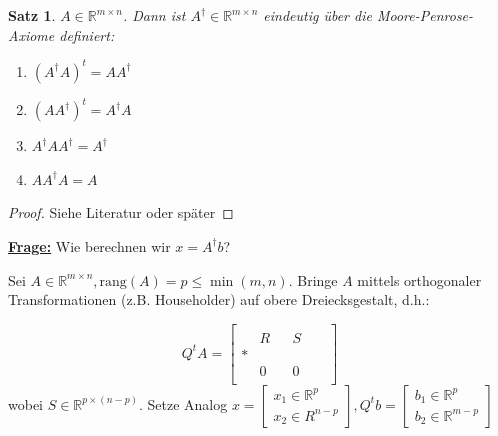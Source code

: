 \documentclass{book}
\newtheorem{theorem}[algorithm]{Satz}
\def\R{\mathbb{R}}
\def\rang{\text{rang}}
\begin{document}
        \begin{theorem}\label{s2.23}
            $A\in\R^{m\times n}$. Dann ist $A^\dagger\in\R^{m\times n}$ eindeutig über die Moore-Penrose-Axiome definiert:
            \begin{enumerate}
                \item $(A^\dagger A)^t=AA^\dagger$
                \item $(AA^\dagger )^t=A^\dagger A$
                \item $A^\dagger AA^\dagger = A^\dagger$
                \item $AA^\dagger A=A$
            \end{enumerate}
        \end{theorem}

        \begin{proof}
            Siehe Literatur oder später
        \end{proof}

        \underline{\textbf{Frage:}} Wie berechnen wir $x=A^\dagger b$?

        Sei $A\in\R^{m\times n},\rang(A)=p\leq \min(m,n)$. Bringe $A$ mittels orthogonaler Transformationen (z.B. Householder) auf 
        obere Dreiecksgestalt, d.h.:

        \begin{equation}\label{g2.6}
            Q^tA=\begin{bmatrix}
                &  &  & & & \\
                & R & & S & & \\
                * & & & & &\\
                & 0 & &  0 & & \\ 
            \end{bmatrix}
        \end{equation}
        wobei  $S\in \R^{p\times (n-p)}$.
        Setze Analog $x=\begin{bmatrix}
            x_1\in\R^p\\
            x_2\in R^{n-p}
        \end{bmatrix},Q^t b=\begin{bmatrix}
            b_1\in\R^p\\
            b_2\in \R^{m-p}
        \end{bmatrix}$
\end{document}
